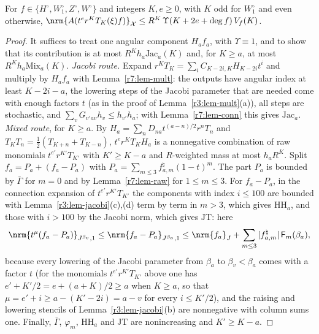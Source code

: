 \begin{lemma}\label{r7:lem-centre}
For $f\in\{H^\circ,W^\circ_1,Z^\circ,W^\circ\}$ and integers $K,e\geq0$, with $K$ odd for $W_1^\circ$ and even otherwise, $\nrm{A(t^er^KT_K(\xi)f)}_{\mathcal X}\leq R^K\,\Upsilon(K+2e+\deg f)\,V_f(K)$.
\end{lemma}

\begin{proof}
It suffices to treat one angular component $H_af_a$, with $\Upsilon\equiv1$, and to show that its contribution is at most $R^Kh_a\mathrm{Jac}_a(K)$ and, for $K\geq a$, at most $R^Kh_a\mathrm{Mix}_a(K)$. \emph{Jacobi route.} Expand $r^KT_K=\sum_iC_{K-2i,K}H_{K-2i}t^i$ and multiply by $H_af_a$ with Lemma~\ref{r7:lem-mult}: the outputs have angular index at least $K-2i-a$, the lowering steps of the Jacobi parameter that are needed come with enough factors $t$ (as in the proof of Lemma~\ref{r3:lem-mult}(a)), all steps are stochastic, and $\sum_vG_{v'av}h_v\leq h_{v'}h_a$; with Lemma~\ref{r7:lem-conn} this gives $\mathrm{Jac}_a$. \emph{Mixed route}, for $K\geq a$. By $H_a=\sum_nD_{na}t^{(a-n)/2}r^nT_n$ and $T_KT_n=\frac12(T_{K+n}+T_{K-n})$, $t^er^KT_KH_a$ is a nonnegative combination of raw monomials $t^{e'}r^{K'}T_{K'}$ with $K'\geq K-a$ and $R$-weighted mass at most $h_aR^K$. Split $f_a=P_a+(f_a-P_a)$ with $P_a=\sum_{m\leq3}f^\natural_{a,m}(1-t)^m$. The part $P_a$ is bounded by $\bar\Gamma$ for $m=0$ and by Lemma~\ref{r7:lem-raw} for $1\leq m\leq3$. For $f_a-P_a$, in the connection expansion of $t^{e'}r^{K'}T_{K'}$ the components with index $i\leq100$ are bounded with Lemma~\ref{r3:lem-jacobi}(c),(d) term by term in $m>3$, which gives $\mathrm{HH}_a$, and those with $i>100$ by the Jacobi norm, which gives $\mathrm{JT}$: here
\[
\nrm{t^\mu(f_a-P_a)}_{J^{\beta_v},1}\leq\nrm{f_a-P_a}_{J^{\beta_a},1}\leq\nrm{f_a}_J+\sum_{m\leq3}|f^\natural_{a,m}|\,\mathsf F_m(\beta_a),
\]
because every lowering of the Jacobi parameter from $\beta_a$ to $\beta_v<\beta_a$ comes with a factor $t$ (for the monomials $t^{e'}r^{K'}T_{K'}$ above one has $e'+K'/2=e+(a+K)/2\geq a$ when $K\geq a$, so that $\mu=e'+i\geq a-(K'-2i)=a-v$ for every $i\leq K'/2$), and the raising and lowering stencils of Lemma~\ref{r3:lem-jacobi}(b) are nonnegative with column sums one. Finally, $\bar\Gamma$, $\varphi_m$, $\mathrm{HH}_a$ and $\mathrm{JT}$ are nonincreasing and $K'\geq K-a$.
\end{proof}


